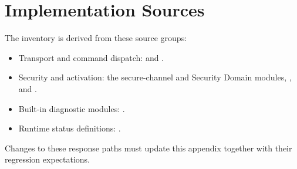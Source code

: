 \clearpage
\section{Implementation Sources}

The inventory is derived from these source groups:
\begin{itemize}
\item Transport and command dispatch:\newline
{} and\newline
{}.
\item Security and activation: the secure-channel and Security Domain modules,
, and\newline
{}.
\item Built-in diagnostic modules:\newline
{}.
\item Runtime status definitions:\newline
{}.
\end{itemize}
Changes to these response paths must update this appendix together with their
regression expectations.
